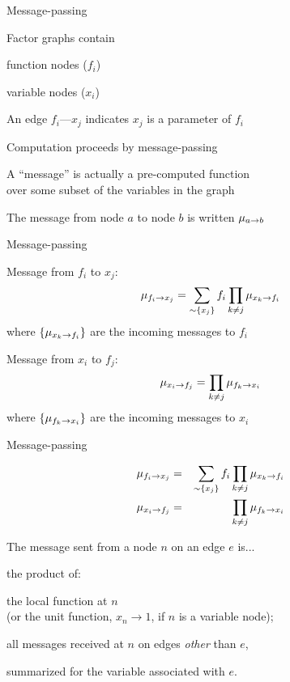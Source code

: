 \documentclass{beamer}
\begin{document}
\begin{frame}{Message-passing}
\itemb
 \item Factor graphs contain
  \itemb
  \item \alert{function nodes} ($f_i$)
  \item \alert{variable nodes} ($x_i$)
  \item An edge $f_i$---$x_j$ indicates $x_j$ is a parameter of $f_i$
  \iteme
 \item Computation proceeds by \alert{message-passing}
 \item A ``message'' is actually a pre-computed function \\ over some subset of the variables in the graph
 \item The message from node $a$ to node $b$ is written $\mu_{a \to b}$
\iteme
\end{frame}

\begin{frame}{Message-passing}
\itemb
  \item Message from $f_i$ to $x_j$:
\[
\mu_{f_i \to x_j} = \sum_{ \sim \{ x_j \} } f_i \prod_{k \neq j} \mu_{x_k \to f_i}
\]
where $\{ \mu_{x_k \to f_i} \}$ are the incoming messages to $f_i$
  \item Message from $x_i$ to $f_j$:
\[
\mu_{x_i \to f_j} = \prod_{k \neq j} \mu_{f_k \to x_i}
\]
where $\{ \mu_{f_k \to x_i} \}$ are the incoming messages to $x_i$
\iteme
\end{frame}

\begin{frame}{Message-passing}

\begin{eqnarray*}
\mu_{f_i \to x_j} & = & \sum_{ \sim \{ x_j \} } f_i \prod_{k \neq j} \mu_{x_k \to f_i} \\
\mu_{x_i \to f_j} & = & \prod_{k \neq j} \mu_{f_k \to x_i}
\end{eqnarray*}

 The message sent from a node $n$ on an edge $e$ is...
   \itemb
   \item the product of:
    \enumb
    \item the local function at $n$ \\
{\small (or the unit function, $x_n \to 1$, if $n$ is a variable node);}
    \item all messages received at $n$ on edges {\em other} than $e$,
    \enume
   \item summarized for the variable associated with $e$.
   \iteme
\end{frame}
\end{document}
